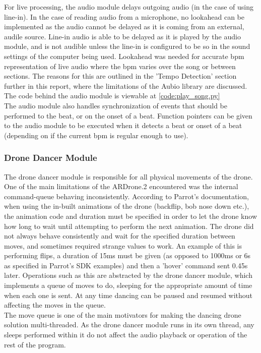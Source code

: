 For live processing, the audio module delays outgoing audio (in the case of using line-in). In the case of
reading audio from a microphone, no lookahead can be implemented as the audio cannot be delayed as it is coming
from an external, audile source. Line-in audio is able to be delayed as it is played by the audio module, and is
not audible unless the line-in is configured to be so in the sound settings of the computer being used. Lookahead
was needed for accurate bpm representation of live audio where the bpm varies over the song or between sections.
The reasons for this are outlined in the 'Tempo Detection' section further in this report, where the limitations
of the Aubio library are discussed. The code behind the audio module is viewable at \eqref{code:play_song.py}\\

The audio module also handles synchronization of events that should be performed to the beat, or on the onset of
a beat. Function pointers can be given to the audio module to be executed when it detects a beat or onset of a
beat (depending on if the current bpm is regular enough to use).

\subsubsection{Drone Dancer Module}
The drone dancer module is responsible for all physical movements of the drone. One of the main limitations of
the ARDrone.2 encountered was the internal command-queue behaving inconsistently. According to Parrot's
documentation, when using the in-built animations of the drone (backflip, bob nose down etc.), the animation code
and duration must be specified in order to let the drone know how long to wait until attempting to perform the
next animation. The drone did not always behave consistently and wait for the specified duration between moves,
and sometimes required strange values to work. An example of this is performing flips, a duration of 15ms must be
given (as opposed to 1000ms or 6s as specified in Parrot's SDK examples) and then a 'hover' command sent 0.45s
later. Operations such as this are abstracted by the drone dancer module, which implements a queue of moves to
do, sleeping for the appropriate amount of time when each one is sent. At any time dancing can be paused and
resumed without affecting the moves in the queue.\\

The move queue is one of the main motivators for making the dancing drone solution multi-threaded. As the drone
dancer module runs in its own thread, any sleeps performed within it do not affect the audio playback or
operation of the rest of the program.\\

